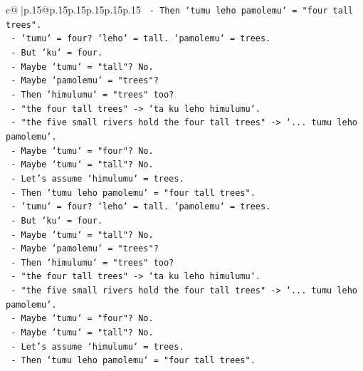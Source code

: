 \documentclass{article}
\begin{document}
{\begin{supertabular}{c@{$\;$}|p{.15\linewidth}@{}p{.15\linewidth}p{.15\linewidth}p{.15\linewidth}p{.15\linewidth}p{.15\linewidth}}
{{{\texttt{                    {-} Then `tumu leho pamolemu` = "four tall trees".} \\
\texttt{                    {-} `tumu` = four? `leho` = tall. `pamolemu` = trees.} \\
\texttt{                    {-} But `ku` = four.} \\
\texttt{                    {-} Maybe `tumu` = "tall"? No.} \\
\texttt{                    {-} Maybe `pamolemu` = "trees"?} \\
\texttt{                    {-} Then `himulumu` = "trees" too?} \\
\texttt{                    {-} "the four tall trees" {-}> `ta ku leho himulumu`.} \\
\texttt{                    {-} "the five small rivers hold the four tall trees" {-}> `... tumu leho pamolemu`.} \\
\texttt{                    {-} Maybe `tumu` = "four"? No.} \\
\texttt{                    {-} Maybe `tumu` = "tall"? No.} \\
\texttt{                    {-} Let's assume `himulumu` = trees.} \\
\texttt{                    {-} Then `tumu leho pamolemu` = "four tall trees".} \\
\texttt{                    {-} `tumu` = four? `leho` = tall. `pamolemu` = trees.} \\
\texttt{                    {-} But `ku` = four.} \\
\texttt{                    {-} Maybe `tumu` = "tall"? No.} \\
\texttt{                    {-} Maybe `pamolemu` = "trees"?} \\
\texttt{                    {-} Then `himulumu` = "trees" too?} \\
\texttt{                    {-} "the four tall trees" {-}> `ta ku leho himulumu`.} \\
\texttt{                    {-} "the five small rivers hold the four tall trees" {-}> `... tumu leho pamolemu`.} \\
\texttt{                    {-} Maybe `tumu` = "four"? No.} \\
\texttt{                    {-} Maybe `tumu` = "tall"? No.} \\
\texttt{                    {-} Let's assume `himulumu` = trees.} \\
\texttt{                    {-} Then `tumu leho pamolemu` = "four tall trees".} \\
}}}
\end{supertabular}}
\end{document}
